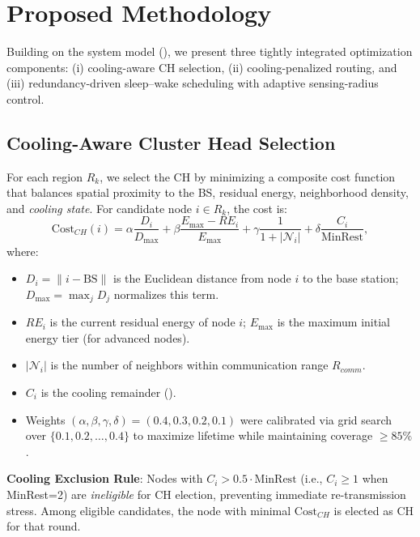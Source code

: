 \section{Proposed Methodology}
\label{sec:methodology}

Building on the system model (), we present three tightly integrated optimization components: (i) cooling-aware CH selection, (ii) cooling-penalized routing, and (iii) redundancy-driven sleep--wake scheduling with adaptive sensing-radius control.

\subsection{Cooling-Aware Cluster Head Selection}
\label{subsec:ch-selection}

For each region $R_k$, we select the CH by minimizing a composite cost function that balances spatial proximity to the BS, residual energy, neighborhood density, and \emph{cooling state}. For candidate node $i \in R_k$, the cost is:
\begin{equation}
\mathrm{Cost}_{CH}(i) = \alpha \frac{D_i}{D_{\max}} + \beta \frac{E_{\max} - RE_i}{E_{\max}} + \gamma \frac{1}{1+|\mathcal{N}_i|} + \delta \frac{C_i}{\text{MinRest}},
\label{eq:ch-cost}
\end{equation}
where:
\begin{itemize}[noitemsep]
  \item $D_i = \|i - \text{BS}\|$ is the Euclidean distance from node $i$ to the base station; $D_{\max} = \max_j D_j$ normalizes this term.
  \item $RE_i$ is the current residual energy of node $i$; $E_{\max}$ is the maximum initial energy tier (for advanced nodes).
  \item $|\mathcal{N}_i|$ is the number of neighbors within communication range $R_{comm}$.
  \item $C_i$ is the cooling remainder ().
  \item Weights $(\alpha, \beta, \gamma, \delta) = (0.4, 0.3, 0.2, 0.1)$ were calibrated via grid search over $\{0.1, 0.2, \ldots, 0.4\}$ to maximize lifetime while maintaining coverage $\ge 85\%$.
\end{itemize}

\textbf{Cooling Exclusion Rule}: Nodes with $C_i > 0.5 \cdot \text{MinRest}$ (i.e., $C_i \ge 1$ when MinRest=2) are \emph{ineligible} for CH election, preventing immediate re-transmission stress. Among eligible candidates, the node with minimal $\mathrm{Cost}_{CH}$ is elected as CH for that round.

